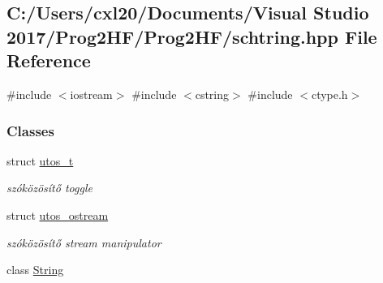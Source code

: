 \subsection{C\+:/\+Users/cxl20/\+Documents/\+Visual Studio 2017/\+Prog2\+H\+F/\+Prog2\+H\+F/schtring.hpp File Reference}
\label{schtring_8hpp}
{\ttfamily \#include $<$iostream$>$}\newline
{\ttfamily \#include $<$cstring$>$}\newline
{\ttfamily \#include $<$ctype.\+h$>$}\newline
\subsubsection*{Classes}
\begin{DoxyCompactItemize}
\item 
struct \mbox{\hyperlink{structutos__t}{utos\+\_\+t}}
\begin{DoxyCompactList}\small\item\em szóközösítő toggle \end{DoxyCompactList}\item 
struct \mbox{\hyperlink{structutos__ostream}{utos\+\_\+ostream}}
\begin{DoxyCompactList}\small\item\em szóközösítő stream manipulator \end{DoxyCompactList}\item 
class \mbox{\hyperlink{class_string}{String}}
\end{DoxyCompactItemize}
